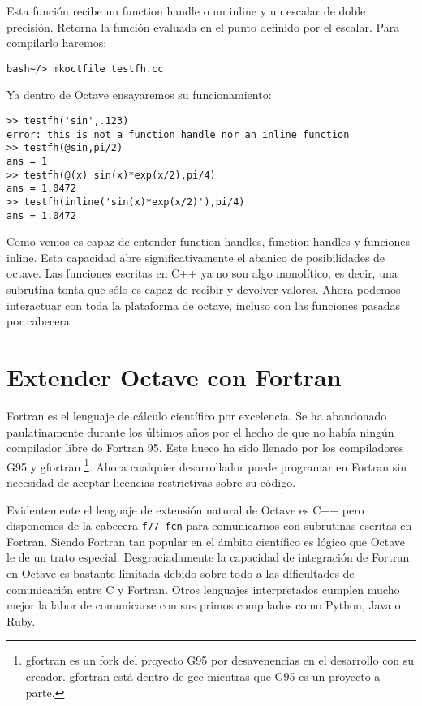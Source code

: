 Esta función recibe un function handle o un inline y un escalar de doble
precisión. Retorna la función evaluada en el punto definido por el escalar.
Para compilarlo haremos:

\begin{verbatim}
bash~/> mkoctfile testfh.cc
\end{verbatim}

Ya dentro de Octave ensayaremos su funcionamiento:

\begin{verbatim}
>> testfh('sin',.123)
error: this is not a function handle nor an inline function
>> testfh(@sin,pi/2)
ans = 1
>> testfh(@(x) sin(x)*exp(x/2),pi/4)
ans = 1.0472
>> testfh(inline('sin(x)*exp(x/2)'),pi/4)
ans = 1.0472
\end{verbatim}

Como vemos es capaz de entender function handles, function handles y
funciones inline.  Esta capacidad abre significativamente el abanico
de posibilidades de octave.  Las funciones escritas en C++ ya no son
algo monolítico, es decir, una subrutina tonta que sólo es capaz de
recibir y devolver valores.  Ahora podemos interactuar con toda
la plataforma de octave, incluso con las funciones pasadas por
cabecera.

\section{Extender Octave con Fortran}

Fortran es el lenguaje de cálculo científico por excelencia. Se ha
abandonado paulatinamente durante los últimos años por el hecho de que
no había ningún compilador libre de Fortran 95. Este hueco ha sido
llenado por los compiladores G95 y gfortran%
\footnote{gfortran es un fork del proyecto G95 por desavenencias en el
  desarrollo con su creador. gfortran está dentro de gcc mientras que
  G95 es un proyecto a parte.%
}. Ahora cualquier desarrollador puede programar en Fortran sin
necesidad de aceptar licencias restrictivas sobre su código.

Evidentemente el lenguaje de extensión natural de Octave es C++ pero
disponemos de la cabecera \texttt{f77-fcn} para comunicarnos con
subrutinas escritas en Fortran. Siendo Fortran tan popular en el
ámbito científico es lógico que Octave le de un trato especial.
Desgraciadamente la capacidad de integración de Fortran en Octave es
bastante limitada debido sobre todo a las dificultades de comunicación
entre C y Fortran.  Otros lenguajes interpretados cumplen mucho mejor
la labor de comunicarse con sus primos compilados como Python, Java o
Ruby.


